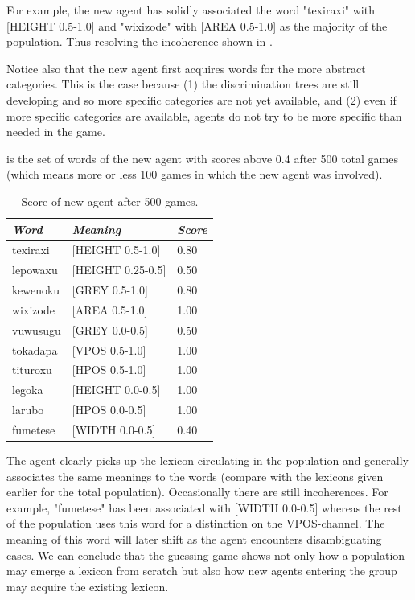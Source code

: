 For example, the new agent
has solidly associated the word "texiraxi" with 
[HEIGHT 0.5-1.0] and "wixizode" with [AREA 0.5-1.0]
as the majority of the population. Thus resolving the 
incoherence shown in . 

Notice also that the new agent first acquires words 
for the more abstract categories. This is the case 
because (1) the discrimination trees are still developing
and so more specific categories are not yet available, 
and (2) even if more specific categories are available, 
agents do not try to be more specific than needed in 
the game. 

 is the set of words of the new agent
with scores above 0.4 after 
500 total games (which means more or less 100 games 
in which the new agent was involved). 
\begin{table}
\begin{center}
\begin{tabular}{ l  l  l } \hline
{\it Word} & {\it Meaning} & {\it Score} \\ \hline
texiraxi &  [HEIGHT 0.5-1.0] & 0.80 \\ \hline
lepowaxu &  [HEIGHT 0.25-0.5] & 0.50 \\ \hline
kewenoku &  [GREY 0.5-1.0] & 0.80 \\ \hline
wixizode & [AREA 0.5-1.0] & 1.00 \\ \hline
vuwusugu & [GREY 0.0-0.5] & 0.50 \\ \hline
tokadapa &  [VPOS 0.5-1.0] & 1.00 \\ \hline
tituroxu &  [HPOS 0.5-1.0] & 1.00 \\ \hline
legoka   &  [HEIGHT 0.0-0.5] & 1.00 \\ \hline
larubo   &  [HPOS 0.0-0.5] & 1.00 \\ \hline
fumetese &  [WIDTH 0.0-0.5] & 0.40 \\ \hline
\end{tabular}
\caption{\label{tab:newagents} Score of new agent after 500 games.}
\end{center}
\end{table}
The agent clearly picks up the lexicon circulating
in the population and generally associates the 
same meanings to the words (compare with the 
lexicons given earlier for the total population). 
Occasionally there are still incoherences. For example, 
"fumetese" has been associated with [WIDTH 0.0-0.5] 
whereas the rest of the population uses this word
for a distinction on the VPOS-channel. The meaning
of this word will later shift as the agent encounters
disambiguating cases. We can conclude that the 
guessing game shows not only how a population may 
emerge a lexicon from scratch but also how new 
agents entering the group may acquire the existing 
lexicon.  

